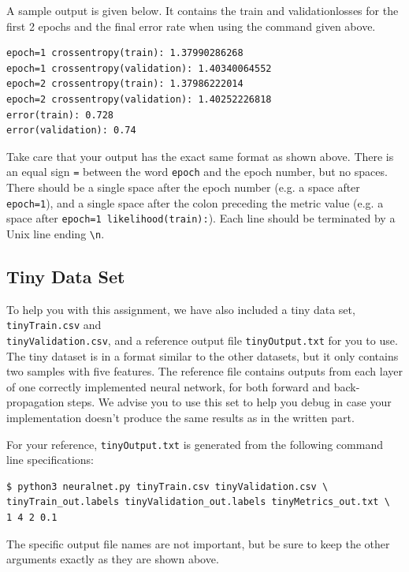 \documentclass[11pt,addpoints,answers]{exam}
\begin{document}
A sample output is given below. It contains the train and validation\thinspace losses for the first 2 epochs and the final error rate when using the command given above.

\begin{lstlisting}
epoch=1 crossentropy(train): 1.37990286268
epoch=1 crossentropy(validation): 1.40340064552
epoch=2 crossentropy(train): 1.37986222014
epoch=2 crossentropy(validation): 1.40252226818
error(train): 0.728
error(validation): 0.74
\end{lstlisting}

Take care that your output has the exact same format as shown above. There is an equal sign \lstinline{=} between the word \lstinline{epoch} and the epoch number, but no spaces. There should be a single space after the epoch number (e.g. a space after \lstinline{epoch=1}), and a single space after the colon preceding the metric value (e.g. a space after \lstinline{epoch=1 likelihood(train):}). Each line should be terminated by a Unix line ending \lstinline{\n}.

\subsection{Tiny Data Set} \label{tiny}
To help you with this assignment, we have also included a tiny data set, \texttt{tinyTrain.csv} and\\ \texttt{tinyValidation.csv}, and a reference output file \texttt{tinyOutput.txt} for you to use. The tiny dataset is in a format similar to the other datasets, but it only contains two samples with five features. The reference file contains outputs from each layer of one correctly implemented neural network, for both forward and back-propagation steps. We advise you to use this set to help you debug in case your implementation doesn't produce the same results as in the written part.

For your reference, \texttt{tinyOutput.txt} is generated from the following command line specifications:

\begin{lstlisting}[language=Shell]
$ python3 neuralnet.py tinyTrain.csv tinyValidation.csv \
tinyTrain_out.labels tinyValidation_out.labels tinyMetrics_out.txt \
1 4 2 0.1
\end{lstlisting}
The specific output file names are not important, but be sure to keep the other arguments exactly as they are shown above.
\end{document}
